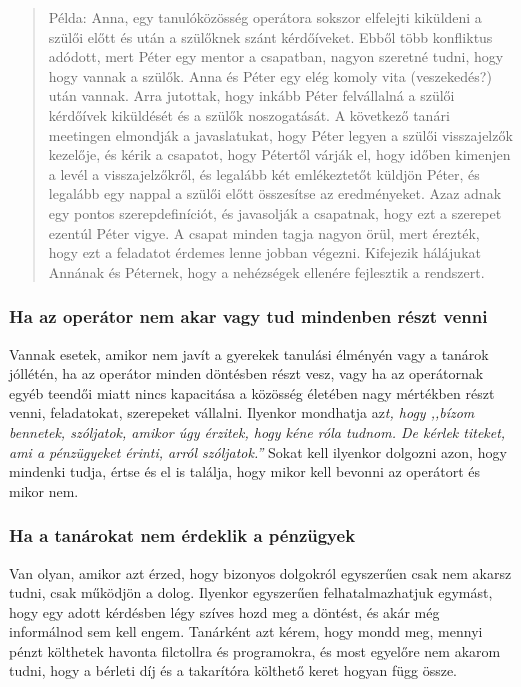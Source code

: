 \begin{quote}
Példa: Anna, egy tanulóközösség operátora sokszor elfelejti kiküldeni a
szülői előtt és után a szülőknek szánt kérdőíveket. Ebből több
konfliktus adódott, mert Péter egy mentor a csapatban, nagyon szeretné
tudni, hogy hogy vannak a szülők. Anna és Péter egy elég komoly vita
(veszekedés?) után vannak. Arra jutottak, hogy inkább Péter felvállalná
a szülői kérdőívek kiküldését és a szülők noszogatását. A következő
tanári meetingen elmondják a javaslatukat, hogy Péter legyen a szülői
visszajelzők kezelője, és kérik a csapatot, hogy Pétertől várják el,
hogy időben kimenjen a levél a visszajelzőkről, és legalább két
emlékeztetőt küldjön Péter, és legalább egy nappal a szülői előtt
összesítse az eredményeket. Azaz adnak egy pontos szerepdefiníciót, és
javasolják a csapatnak, hogy ezt a szerepet ezentúl Péter vigye. A
csapat minden tagja nagyon örül, mert érezték, hogy ezt a feladatot
érdemes lenne jobban végezni. Kifejezik hálájukat Annának és Péternek,
hogy a nehézségek ellenére fejlesztik a rendszert.
\end{quote}

\hypertarget{mi-van-ha-az-operator-nem-akar-vagy-tud-mindenben-reszt-venni}{%
\subsubsection{Ha az operátor nem akar vagy tud mindenben részt
venni}\label{mi-van-ha-az-operator-nem-akar-vagy-tud-mindenben-reszt-venni}}

Vannak esetek, amikor nem javít a gyerekek tanulási élményén vagy a
tanárok jóllétén, ha az operátor minden döntésben részt vesz, vagy ha az
operátornak egyéb teendői miatt nincs kapacitása a közösség életében
nagy mértékben részt venni, feladatokat, szerepeket vállalni. Ilyenkor\break
mondhatja az\emph{t, hogy ,,bízom bennetek, szóljatok, amikor úgy
érzitek, hogy kéne róla tudnom. De kérlek titeket, ami a pénzügyeket
érinti, arról szóljatok.''} Sokat kell ilyenkor dolgozni azon, hogy
mindenki tudja, értse és el is találja, hogy mikor kell bevonni az
operátort és mikor nem.

\hypertarget{mi-van-ha-a-tanarokat-nem-erdeklik-a-penzugyek}{%
\subsubsection{Ha a tanárokat nem érdeklik a
pénzügyek}\label{mi-van-ha-a-tanarokat-nem-erdeklik-a-penzugyek}}

Van olyan, amikor azt érzed, hogy bizonyos dolgokról egyszerűen csak nem
akarsz tudni, csak működjön a dolog. Ilyenkor egyszerűen
felhatalmazhatjuk egymást, hogy egy adott kérdésben légy szíves hozd meg
a döntést, és akár még informálnod sem kell engem. Tanárként azt kérem,
hogy mondd meg, mennyi pénzt költhetek havonta filctollra és
programokra, és most egyelőre nem akarom tudni, hogy a bérleti díj és a
takarítóra költhető keret hogyan függ össze.


